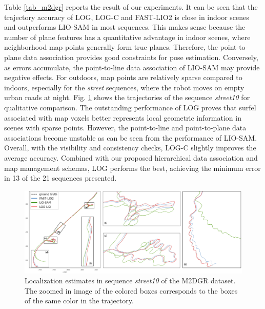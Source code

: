 \documentclass[letterpaper, 10 pt, conference]{ieeeconf}  %
\begin{document}
Table \ref{tab_m2dgr} reports the result of our experiments.
It can be seen that the trajectory accuracy of LOG, LOG-C and FAST-LIO2 is close in indoor scenes and outperforms LIO-SAM in most sequences.
This makes sense because the number of plane features has a quantitative advantage in indoor scenes, where neighborhood map points generally form true planes.
Therefore, the point-to-plane data association provides good constraints for pose estimation.
Conversely, as errors accumulate, the point-to-line data association of LIO-SAM may provide negative effects.
For outdoors, map points are relatively sparse compared to indoors, especially for the \emph{street} sequences, where the robot moves on empty urban roads at night.
Fig. \ref{fig_street10} shows the trajectories of the sequence \emph{street10} for qualitative comparison.
The outstanding performance of LOG proves that surfel associated with map voxels better represents local geometric information in scenes with sparse points.
However, the point-to-line and point-to-plane data associations become unstable as can be seen from the performance of LIO-SAM.
Overall, with the visibility and consistency checks, LOG-C slightly improves the average accuracy.
Combined with our proposed hierarchical data association and map management schemas, LOG performs the best, achieving the minimum error in 13 of the 21 sequences presented.
\begin{figure}[!ht]
        \centering
        \includegraphics[width=16cm]{fig/street10.pdf}
        \caption{Localization estimates in sequence \emph{street10} of the M2DGR dataset.
                 The zoomed in image of the colored boxes corresponds to the boxes of the same color in the trajectory.}
        \label{fig_street10}
\end{figure}
\end{document}
